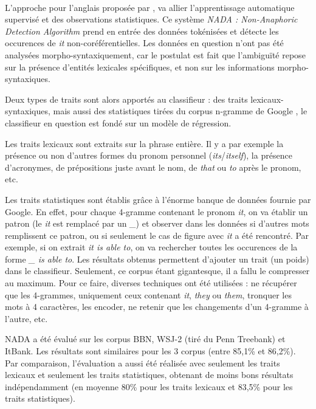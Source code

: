 \documentclass[a4paper,12pt]{article}
\begin{document}
\paragraph{}
L'approche pour l'anglais proposée par \citet{Bergsma-11}, va allier l'apprentissage automatique supervisé et des observations statistiques.
Ce système \textit{NADA : Non-Anaphoric Detection Algorithm} prend en entrée des données tokénisées et détecte les occurences de \og{}\textit{it}\fg{} non-coréférentielles. Les données en question n'ont pas été analysées morpho-syntaxiquement, car le postulat est fait que l'ambiguïté repose sur la présence d'entités lexicales spécifiques, et non sur les informations morpho-syntaxiques.


Deux types de traits sont alors apportés au classifieur : des traits lexicaux-syntaxiques, mais aussi des statistiques tirées du corpus n-gramme de Google \citep{google-ngram}, le classifieur en question est fondé sur un modèle de régression.

Les traits lexicaux sont extraits sur la phrase entière. Il y a par exemple la présence ou non d'autres formes du pronom personnel (\textit{its}/\textit{itself}), la présence d'acronymes, de prépositions juste avant le nom, de \og{}\textit{that}\fg{} ou \og{}\textit{to}\fg{} après le pronom, etc.

Les traits statistiques sont établis grâce à l'énorme banque de données fournie par Google. En effet, pour chaque 4-gramme contenant le pronom \og{}\textit{it}\fg{}, on va établir un patron (le \og{}\textit{it}\fg{} est remplacé par un \og{}\textit{\_}\fg{}) et observer dans les données si d'autres mots remplissent ce patron, ou si seulement le cas de figure avec \og{}\textit{it}\fg{} a été rencontré. Par exemple, si on extrait \og{}\textit{it is able to}\fg{}, on va rechercher toutes les occurences de la forme \og{}\textit{\_ is able to}\fg{}.
Les résultats obtenus permettent d'ajouter un trait (un poids) dans le classifieur.
Seulement, ce corpus étant gigantesque, il a fallu le compresser au maximum. Pour ce faire, diverses techniques ont été utilisées : ne récupérer que les 4-grammes, uniquement ceux contenant \og{}\textit{it}\fg{}, \og{}\textit{they}\fg{} ou \og{}\textit{them}\fg{}, tronquer les mots à 4 caractères, les encoder, ne retenir que les changements d'un 4-gramme à l'autre, etc.

NADA a été évalué sur les corpus BBN\cite{BBN}, WSJ-2 (tiré du Penn Treebank\cite{Marcus-1993-BLA-972470.972475}) et ItBank\cite{Bergsma08distributionalidentification}. Les résultats sont similaires pour les 3 corpus (entre 85,1\% et 86,2\%). Par comparaison, l'évaluation a aussi été réalisée avec seulement les traits lexicaux et seulement les traits statistiques, obtenant de moins bons résultats indépendamment (en moyenne 80\% pour les traits lexicaux et 83,5\% pour les traits statistiques).
\end{document}
